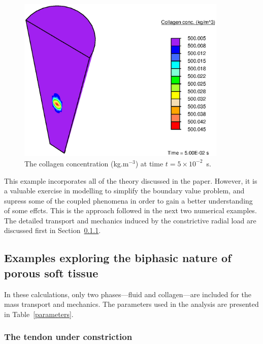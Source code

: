 \begin{figure}
\centering
\includegraphics[width=10.00cm]{images/final-collagen-concentration.eps}
\caption{The collagen concentration (kg.m$^{-3}$) at time
  $t=5\times10^{-2}$~s.}
\label{eg3conc}
\end{figure}

This example incorporates all of the theory discussed in the
paper. However, it is a valuable exercise in
modelling to simplify the boundary value problem, and supress some of
the coupled phenomena in order to gain a better understanding of some
effcts. This is the approach followed in the next two numerical
examples. The detailed transport and mechanics induced by the
constrictive radial load are discussed first in Section~\ref{pinching}. 

\subsection{Examples exploring the biphasic nature of porous soft tissue}
\label{firstorder}

In these calculations, only two phases---fluid and collagen---are
included for the mass transport and mechanics. The parameters used in the analysis
are presented in Table~\ref{parameters}. 


\subsubsection{The tendon under constriction}
\label{pinching}


